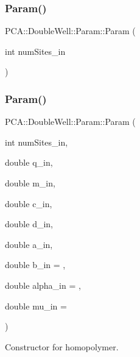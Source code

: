 \subsubsection{\texorpdfstring{Param()}{Param()}\hspace{0.1cm}{\footnotesize\ttfamily [1/2]}}
{\footnotesize\ttfamily P\+C\+A\+::\+Double\+Well\+::\+Param\+::\+Param (\begin{DoxyParamCaption}\item[{int}]{num\+Sites\+\_\+in }\end{DoxyParamCaption})}

\hypertarget{class_p_c_a_1_1_double_well_1_1_param_a8557df1fe94ffb4fb87958d107705910}{}\label{class_p_c_a_1_1_double_well_1_1_param_a8557df1fe94ffb4fb87958d107705910} 
\subsubsection{\texorpdfstring{Param()}{Param()}\hspace{0.1cm}{\footnotesize\ttfamily [2/2]}}
{\footnotesize\ttfamily P\+C\+A\+::\+Double\+Well\+::\+Param\+::\+Param (\begin{DoxyParamCaption}\item[{int}]{num\+Sites\+\_\+in,  }\item[{double}]{q\+\_\+in,  }\item[{double}]{m\+\_\+in,  }\item[{double}]{c\+\_\+in,  }\item[{double}]{d\+\_\+in,  }\item[{double}]{a\+\_\+in,  }\item[{double}]{b\+\_\+in = {},  }\item[{double}]{alpha\+\_\+in = {},  }\item[{double}]{mu\+\_\+in = {} }\end{DoxyParamCaption})}



Constructor for homopolymer. 

\hypertarget{class_p_c_a_1_1_double_well_1_1_param_a8369b33896b97469e73d0ca14ccf6315}{}\label{class_p_c_a_1_1_double_well_1_1_param_a8369b33896b97469e73d0ca14ccf6315} 
